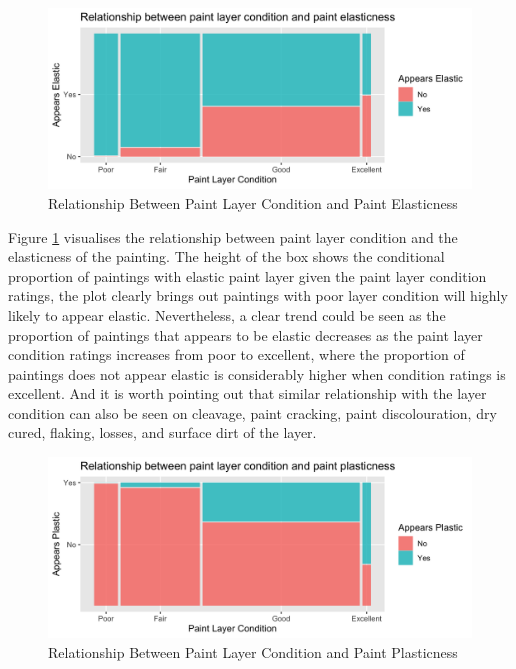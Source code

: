 \documentclass[11pt, oneside]{article}
\begin{document}
\begin{figure}[H]
    \centering
    \includegraphics[scale=0.2]{images/pl_elastic.png}
    \caption{Relationship Between Paint Layer Condition and Paint Elasticness}
    \label{pl_elastic}
\end{figure}

\noindent Figure \ref{pl_elastic} visualises the relationship between paint layer condition and the elasticness of the painting. The height of the box shows the conditional proportion of paintings with elastic paint layer given the paint layer condition ratings, the plot clearly brings out paintings with poor layer condition will highly likely to appear elastic. Nevertheless, a clear trend could be seen as the proportion of paintings that appears to be elastic decreases as the paint layer condition ratings increases from poor to excellent, where the proportion of paintings does not appear elastic is considerably higher when condition ratings is excellent. 
\bigbreak
\noindent And it is worth pointing out that similar relationship with the layer condition can also be seen on cleavage, paint cracking, paint discolouration, dry cured, flaking, losses, and surface dirt of the layer.

\begin{figure}[H]
    \centering
    \includegraphics[scale=0.2]{images/pl_plastic.png}
    \caption{Relationship Between Paint Layer Condition and Paint Plasticness}
    \label{pl_plastic}
\end{figure}
\end{document}
